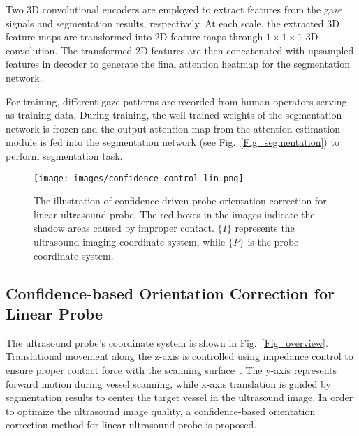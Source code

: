 \par
{}
Two 3D convolutional encoders are employed to extract features from the gaze signals and segmentation results, respectively. At each scale, the extracted 3D feature maps are transformed into 2D feature maps through $1\times1\times1$ 3D convolution. The transformed 2D features are then concatenated with upsampled features in decoder to generate the final attention heatmap for the segmentation network.

\par
For training, different gaze patterns are recorded from human operators serving as training data. During training, the well-trained weights of the segmentation network is frozen and the output attention map from the attention estimation module is fed into the segmentation network (see Fig.~\ref{Fig_segmentation}) to perform segmentation task. 

\begin{figure}[ht!]
\centering
\texttt{[image: images/confidence\_control\_lin.png]}
\caption{The illustration of confidence-driven probe orientation correction for linear ultrasound probe. The red boxes in the images indicate the shadow areas caused by improper contact. $\{I\}$ represents the ultrasound imaging coordinate system, while $\{P\}$ is the probe coordinate system.
}
\label{Fig_conf_control}
\end{figure}

\subsection{Confidence-based Orientation Correction for Linear Probe}
The ultrasound probe's coordinate system is shown in Fig.~\ref{Fig_overview}. Translational movement along the z-axis is controlled using impedance control to ensure proper contact force with the scanning surface~\cite{jiang2021autonomous}. The y-axis represents forward motion during vessel scanning, while x-axis translation is guided by segmentation results to center the target vessel in the ultrasound image. In order to optimize the ultrasound image quality, a confidence-based orientation correction method for linear ultrasound probe is proposed.

